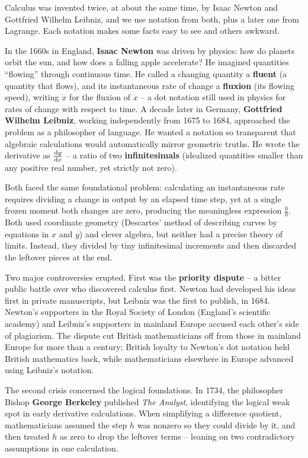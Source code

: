 Calculus was invented twice, at about the same time, by Isaac Newton and
Gottfried Wilhelm Leibniz, and we use notation from both, plus a later one from
Lagrange. Each notation makes some facts easy to see and others awkward.

\begin{historybox}
In the 1660s in England, \textbf{Isaac Newton} was driven by physics: how do
planets orbit the sun, and how does a falling apple accelerate? He imagined
quantities ``flowing'' through continuous time. He called a changing quantity a
\textbf{fluent} (a quantity that flows), and its instantaneous rate of change a
\textbf{fluxion} (its flowing speed), writing $\dot{x}$ for the fluxion of $x$
-- a dot notation still used in physics for rates of change with respect to
time. A decade later in Germany,
\textbf{Gottfried Wilhelm Leibniz}, working independently from 1675 to 1684,
approached the problem as a philosopher of language. He wanted a notation so
transparent that algebraic calculations would automatically mirror geometric
truths. He wrote the derivative as $\frac{\mathrm{d} y}{\mathrm{d} x}$ -- a ratio of two
\textbf{infinitesimals} (idealized quantities smaller than any positive real
number, yet strictly not zero).

Both faced the same foundational problem: calculating an
instantaneous rate requires dividing a change in output by an elapsed time step,
yet at a single frozen moment both changes are zero, producing the meaningless
expression $\frac{0}{0}$. Both used coordinate geometry (Descartes' method of
describing curves by equations in $x$ and $y$) and clever algebra, but neither
had a precise theory of limits.
Instead, they divided by tiny infinitesimal increments and then discarded the
leftover pieces at the end.

Two major controversies erupted. First was the \textbf{priority dispute}
-- a bitter public battle over who discovered calculus first. Newton had developed
his ideas first in private manuscripts, but Leibniz was the first to publish, in
1684. Newton's supporters in the Royal Society of London (England's scientific
academy) and Leibniz's supporters in mainland Europe accused each other's side of
plagiarism. The dispute cut British mathematicians off from those in mainland
Europe for more than a century; British loyalty to Newton's dot notation held
British mathematics back, while mathematicians elsewhere in Europe advanced
using Leibniz's notation.

The second crisis concerned the logical foundations. In 1734, the philosopher Bishop
\textbf{George Berkeley} published \emph{The Analyst}, identifying the logical weak spot in early derivative calculations.
When simplifying a difference quotient, mathematicians assumed the step $h$ was
nonzero so they could divide by it, and then treated $h$ as zero to drop the leftover
terms -- leaning on two contradictory assumptions in one calculation.


\end{historybox}
